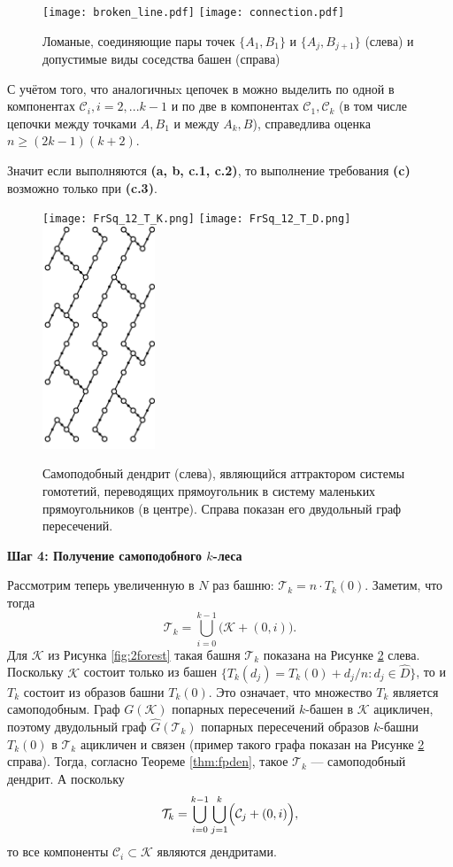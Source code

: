 \begin{figure}[h]
\texttt{[image: broken\_line.pdf]}
\hfill
\texttt{[image: connection.pdf]}
\caption{Ломаные, соединяющие пары точек $\{A_1, B_1\}$ и $\{A_j, B_{j+1}\}$ (слева) и допустимые виды соседства башен (справа)}
\label{fig:brokenline}
\end{figure}

С учётом того, что аналогичныx цепочек в можно выделить по одной в компонентах ${\mathcal{C}}_i, i=2,...k-1$ и по две в компонентах ${\mathcal{C}}_1, {\mathcal{C}}_k$ (в том числе цепочки между точками $A, B_1$ и между $A_k, B$), справедлива оценка $n\geq(2k-1)(k+2)$.

Значит если выполняются {\bf(a, b, c.1, c.2)}, то выполнение требования {\bf(c)} возможно только при {\bf(c.3)}.\\

\begin{figure}[h]
\texttt{[image: FrSq\_12\_T\_K.png]}
\hfill
\texttt{[image: FrSq\_12\_T\_D.png]}
\hfill
\includegraphics[width=0.3\textwidth]{images/img3/BIG.pdf}
\caption{Самоподобный дендрит (слева), являющийся аттрактором системы гомотетий, переводящих прямоугольник в систему маленьких прямоугольников (в центре). Справа показан его двудольный граф пересечений.}
\label{fig:2tower}
\end{figure}


\textbf{Шаг 4: Получение самоподобного $k$-леса}

Рассмотрим теперь увеличенную в $N$ раз башню: 
$\mathcal{T}_k=n\cdot T_k(0).$
Заметим, что тогда 
$$\mathcal{T}_k=\bigcup\limits_{i=0}^{k-1}\bigl({\mathcal{K}}+(0,i)\bigr).$$
Для ${\mathcal{K}}$ из Рисунка \ref{fig:2forest} такая башня $\mathcal{T}_k$ показана на Рисунке \ref{fig:2tower} слева.
Поскольку ${\mathcal{K}}$ состоит только из башен $\{T_k(d_j)=T_k(0)+d_j/n : d_j\in\hat D\}$, то и $T_k$ состоит из образов башни $T_k(0)$.
Это означает, что множество $T_k$ является самоподобным.
Граф $G({\mathcal{K}})$ попарных пересечений $k$-башен в ${\mathcal{K}}$ ацикличен, поэтому двудольный граф $\hat G(\mathcal{T}_k)$ попарных пересечений образов $k$-башни $T_k(0)$ в $\mathcal{T}_k$ ацикличен и связен (пример такого графа показан на Рисунке \ref{fig:2tower} справа).
Тогда, согласно Теореме \ref{thm:fpden}, такое $\mathcal{T}_k$ --- самоподобный дендрит.
А поскольку 
$$\mathcal{T}_k=\bigcup_{i=0}^{k-1}\bigcup_{j=1}^k\Bigl({\mathcal{C}}_j+(0,i)\Bigr),$$ то все компоненты ${\mathcal{C}}_i\subset{\mathcal{K}}$ являются дендритами.

